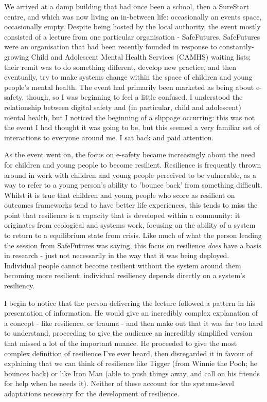 We arrived at a damp building that had once been a school, then a SureStart centre, and which was now living an in-between life: occasionally an events space, occasionally empty. Despite being hosted by the local authority, the event mostly consisted of a lecture from one particular organisation - SafeFutures. SafeFutures were an organisation that had been recently founded in response to constantly-growing Child and Adolescent Mental Health Services (CAMHS) waiting lists; their remit was to do something different, develop new practice, and then eventually, try to make systems change within the space of children and young people's mental health. The event had primarily been marketed as being about e-safety, though, so I was beginning to feel a little confused. I understood the relationship between digital safety and (in particular, child and adolescent) mental health, but I noticed the beginning of a slippage occurring: this was not the event I had thought it was going to be, but this seemed a very familiar set of interactions to everyone around me. I sat back and paid attention. 

As the event went on, the focus on e-safety became increasingly about the need for children and young people to become resilient. Resilience is frequently thrown around in work with children and young people perceived to be vulnerable, as a way to refer to a young person's ability to 'bounce back' from something difficult. Whilst it is true that children and young people who score as resilient on outcomes frameworks tend to have better life experiences, this tends to miss the point that resilience is a capacity that is developed within a community: it originates from ecological and systems work, focusing on the ability of a system to return to a equilibrium state from crisis. Like much of what the person leading the session from SafeFutures was saying, this focus on resilience \textit{does} have a basis in research - just not necessarily in the way that it was being deployed. Individual people cannot become resilient without the system around them becoming more resilient; individual resiliency depends directly on a system's resiliency. 

I begin to notice that the person delivering the lecture followed a pattern in his presentation of information. He would give an incredibly complex explanation of a concept - like resilience, or trauma - and then make out that it was far too hard to understand, proceeding to give the audience an incredibly simplified version that missed a lot of the important nuance. He proceeded to give the most complex definition of resilience I've ever heard, then disregarded it in favour of explaining that we can think of resilience like Tigger (from Winnie the Pooh; he bounces back) or like Iron Man (able to push things away, and call on his friends for help when he needs it). Neither of these account for the systems-level adaptations necessary for the development of resilience.

